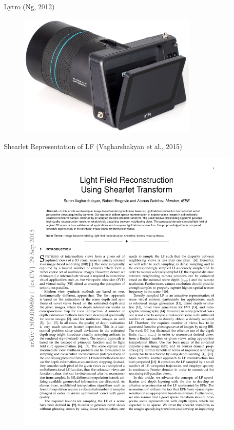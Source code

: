 \begin{frame}{Lytro (Ng, 2012)}
\begin{figure}[h!]
\centering
\includegraphics[width=0.8\textwidth]{../../Diagrams/lytro.jpg}
\label{fig:C2S0F3}
\end{figure}
\end{frame}

\begin{frame}{Shearlet Representation of LF (Vagharshakyan et al., 2015)}
\begin{figure}[h!]
\centering
\includegraphics[width=1\textwidth]{./images/LightField_Shearlet.pdf}
\end{figure}
\end{frame}

